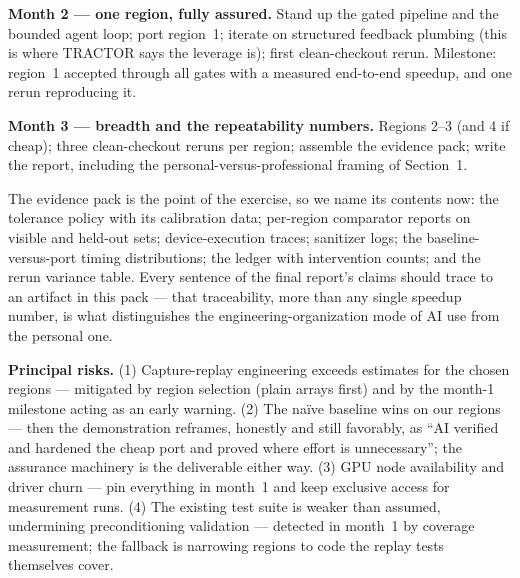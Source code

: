 \documentclass[11pt]{article}
\begin{document}
\textbf{Month 2 --- one region, fully assured.} Stand up the gated pipeline and the bounded agent loop; port region~1; iterate on structured feedback plumbing (this is where TRACTOR says the leverage is); first clean-checkout rerun. Milestone: region~1 accepted through all gates with a measured end-to-end speedup, and one rerun reproducing it.

\textbf{Month 3 --- breadth and the repeatability numbers.} Regions 2--3 (and 4 if cheap); three clean-checkout reruns per region; assemble the evidence pack; write the report, including the personal-versus-professional framing of Section~1.

The evidence pack is the point of the exercise, so we name its contents now: the tolerance policy with its calibration data; per-region comparator reports on visible and held-out sets; device-execution traces; sanitizer logs; the baseline-versus-port timing distributions; the ledger with intervention counts; and the rerun variance table. Every sentence of the final report's claims should trace to an artifact in this pack --- that traceability, more than any single speedup number, is what distinguishes the engineering-organization mode of AI use from the personal one.

\textbf{Principal risks.} (1) Capture-replay engineering exceeds estimates for the chosen regions --- mitigated by region selection (plain arrays first) and by the month-1 milestone acting as an early warning. (2) The na\"ive baseline wins on our regions --- then the demonstration reframes, honestly and still favorably, as ``AI verified and hardened the cheap port and proved where effort is unnecessary''; the assurance machinery is the deliverable either way. (3) GPU node availability and driver churn --- pin everything in month~1 and keep exclusive access for measurement runs. (4) The existing test suite is weaker than assumed, undermining preconditioning validation --- detected in month~1 by coverage measurement; the fallback is narrowing regions to code the replay tests themselves cover.
\end{document}
